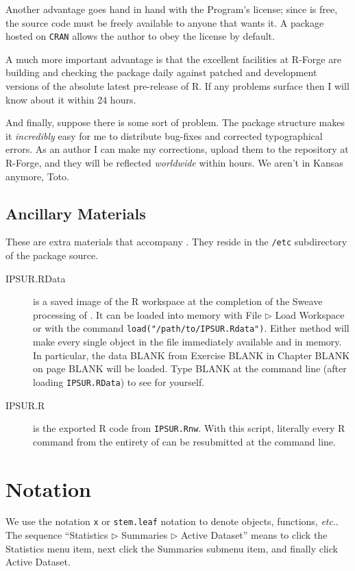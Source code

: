 \documentclass[captions=tableheading]{scrbook}
\begin{document}
Another advantage goes hand in hand with the Program's license; since \IPSUR is free, the source code must be freely available to anyone that wants it. A package hosted on \texttt{CRAN} allows the author to obey the license by default.

A much more important advantage is that the excellent facilities at \textsf{R}-Forge are building and checking the package daily against patched and development versions of the absolute latest pre-release of \textsf{R}. If any problems surface then I will know about it within 24 hours.

And finally, suppose there is some sort of problem. The package structure makes it \emph{incredibly} easy for me to distribute bug-fixes and corrected typographical errors. As an author I can make my corrections, upload them to the repository at \textsf{R}-Forge, and they will be reflected \emph{worldwide} within hours. We aren't in Kansas anymore, Toto.

\subsection*{Ancillary Materials}

These are extra materials that accompany \IPSUR. They reside in the \texttt{/etc} subdirectory of the package source. 

\begin{description}
\item[IPSUR.RData] is a saved image of the \textsf{R} workspace at the completion of the Sweave processing of \IPSUR. It can be loaded into memory with \textsf{File} \(\triangleright\) \textsf{Load Workspace} or with the command \texttt{load("/path/to/IPSUR.Rdata")}. Either method will make every single object in the file immediately available and in memory. In particular, the data BLANK from Exercise BLANK in Chapter BLANK on page BLANK will be loaded. Type BLANK at the command line (after loading \texttt{IPSUR.RData}) to see for yourself.
\item[IPSUR.R] is the exported \textsf{R} code from \texttt{IPSUR.Rnw}. With this script, literally every \textsf{R} command from the entirety of \IPSUR can be resubmitted at the command line.
\end{description}

\section*{Notation}

We use the notation \texttt{x} or \texttt{stem.leaf} notation to denote objects, functions, \emph{etc}.. The sequence ``\textsf{Statistics} \textsf{\(\triangleright\)} \textsf{Summaries} \textsf{\(\triangleright\)} \textsf{Active Dataset}'' means to click the \textsf{Statistics} menu item, next click the \textsf{Summaries} submenu item, and finally click \textsf{Active Dataset}.
\end{document}
